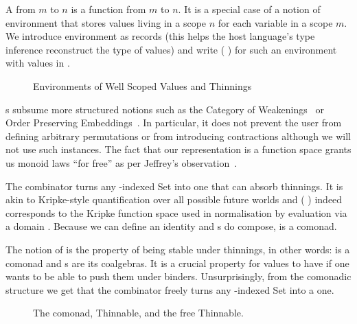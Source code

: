 A  from $m$ to $n$ is a function from  $m$ to
 $n$. It is a special case of a notion of environment that
stores values living in a scope $n$ for each variable in a scope $m$.
We introduce environment as records (this helps the host language's
type inference reconstruct the type of values) and write
( )   for such an environment with values
in .

\begin{figure}[h]
\begin{minipage}{0.55\textwidth}
\end{minipage}\hspace{2em}
\begin{minipage}{0.35\textwidth}
\end{minipage}
\caption{Environments of Well Scoped Values and Thinnings}
\end{figure}

s subsume more structured notions such as the Category of
Weakenings~\cite{altenkirch1995categorical} or Order Preserving
Embeddings~\cite{chapman2009type}. In particular, it does not prevent the
user from defining arbitrary permutations or from introducing contractions
although we will not use such instances. The fact that our representation
is a function space grants us monoid laws ``for free'' as per Jeffrey's
observation~\citeyear{jeffrey2011assoc}.

The  combinator turns any -indexed Set into one that can absorb
thinnings. It is akin to Kripke-style quantification over all possible future
worlds and  (  ) indeed corresponds to the Kripke
function space used in normalisation by evaluation via a domain .
Because we can define an identity  and s do
compose,  is a comonad.

The notion of  is the property of being stable under thinnings,
in other words:  is a comonad and s are its coalgebras.
It is a crucial property for values to have if one wants to be able to push
them under binders. Unsurprisingly, from the comonadic structure we get that
the  combinator freely turns any -indexed Set into a 
one.

\begin{figure}[h]
\begin{minipage}{0.45\textwidth}
\end{minipage}\hspace{2em}
\begin{minipage}{0.45\textwidth}
\end{minipage}
\caption{The  comonad, Thinnable, and the free Thinnable.}
\end{figure}

